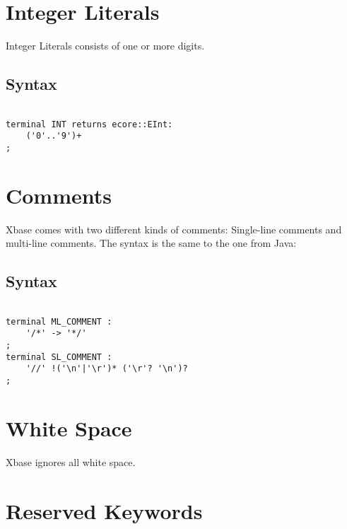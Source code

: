 \documentclass[a4paper,10pt]{scrreprt}
\begin{document}
\section{Integer Literals}
\label{IntegerLiterals}

Integer Literals consists of one or more digits.

\subsection{ Syntax }


\begin{lstlisting}

terminal INT returns ecore::EInt: 
	('0'..'9')+
;

\end{lstlisting}







\section{Comments}
\label{Comments}

Xbase comes with two different kinds of comments: Single-line comments and multi-line comments.
The syntax is the same to the one from Java:

\subsection{ Syntax }


\begin{lstlisting}

terminal ML_COMMENT	: 
	'/*' -> '*/'
;
terminal SL_COMMENT : 
	'//' !('\n'|'\r')* ('\r'? '\n')?
;

\end{lstlisting}







\section{White Space}
\label{Whitespace}

Xbase ignores all white space.




\section{Reserved Keywords}
\label{Keywords}
\end{document}
